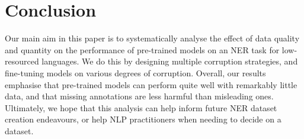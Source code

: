 \documentclass{article}
\begin{document}
\section{Conclusion}
Our main aim in this paper is to systematically analyse the effect of data quality and quantity on the performance of pre-trained models on an NER task for low-resourced languages. We do this by designing multiple corruption strategies, and fine-tuning models on various degrees of corruption.
Overall, our results emphasise that pre-trained models can perform quite well with remarkably little data, and that missing annotations are less harmful than misleading ones. Ultimately, we hope that this analysis can help inform future NER dataset creation endeavours, or help NLP practitioners when needing to decide on a dataset.


\end{document}
